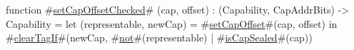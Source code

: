function #\hyperref[sailRISCVzsetCapOffsetChecked]{setCapOffsetChecked}# (cap, offset) : (Capability, CapAddrBits) -> Capability =
    let (representable, newCap) = #\hyperref[sailRISCVzsetCapOffset]{setCapOffset}#(cap, offset) in
    #\hyperref[sailRISCVzclearTagIf]{clearTagIf}#(newCap, #\hyperref[sailRISCVznot]{not}#(representable) | #\hyperref[sailRISCVzisCapSealed]{isCapSealed}#(cap))

